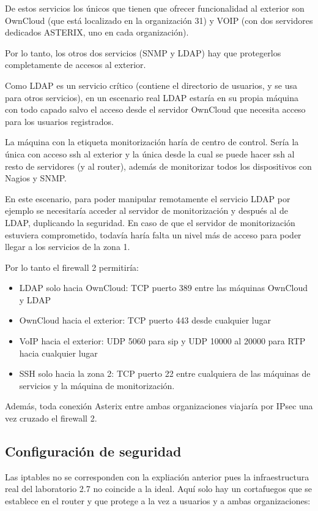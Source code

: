 \documentclass[]{article}
\begin{document}
De estos servicios los únicos que tienen que ofrecer funcionalidad al exterior son OwnCloud (que está localizado en la organización 31) y VOIP (con dos servidores dedicados ASTERIX, uno en cada organización).

Por lo tanto, los otros dos servicios (SNMP y LDAP) hay que protegerlos completamente de accesos al exterior. 

Como LDAP es un servicio crítico (contiene el directorio de usuarios, y se usa para otros servicios), en un escenario real LDAP estaría en su propia máquina con todo capado salvo el acceso desde el servidor OwnCloud que necesita acceso para los usuarios registrados.

La máquina con la etiqueta monitorización haría de centro de control. Sería la única con acceso ssh al exterior y la única desde la cual se puede hacer ssh al resto de servidores (y al router), además de monitorizar todos los dispositivos con Nagios y SNMP.

En este escenario, para poder manipular remotamente el servicio LDAP por ejemplo se necesitaría acceder al servidor de monitorización y después al de LDAP, duplicando la seguridad. En caso de que el servidor de monitorización estuviera comprometido, todavía haría falta un nivel más de acceso para poder llegar a los servicios de la zona 1.

Por lo tanto el firewall 2 permitiría:

\begin{itemize}
	\item LDAP solo hacia OwnCloud: TCP puerto 389 entre las máquinas OwnCloud y LDAP
	\item OwnCloud hacia el exterior: TCP puerto 443 desde cualquier lugar
	\item VoIP hacia el exterior: UDP 5060 para sip y UDP 10000 al 20000 para RTP hacia cualquier lugar
	\item SSH solo hacia la zona 2: TCP puerto 22 entre cualquiera de las máquinas de servicios y la máquina de monitorización.
\end{itemize}

Además, toda conexión Asterix entre ambas organizaciones viajaría por IPsec una vez cruzado el firewall 2.

\subsection{Configuración de seguridad}
Las iptables no se corresponden con la expliación anterior pues la infraestructura real del laboratorio 2.7 no coincide a la ideal. Aquí solo hay un cortafuegos que se establece en el router y que protege a la vez a usuarios y a ambas organizaciones:
\end{document}
